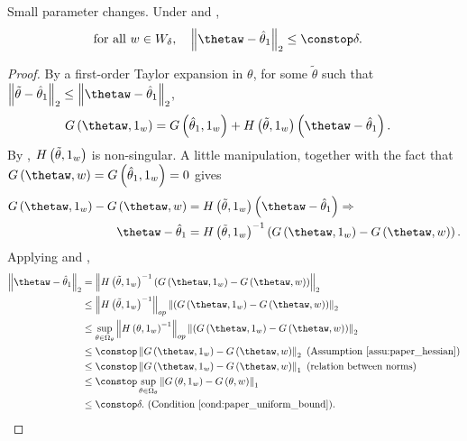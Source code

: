 \begin{lem}
\label{lem:theta_difference_bound}Small parameter changes. Under
\globalassum and ,
\begin{align*}
\textrm{for all }w\in W_{\delta},\quad\norm{{{\thetaw}}-\thetaone}_{2} & \le\constop\delta.
\end{align*}
\end{lem}
\begin{proof}
By a first-order Taylor expansion in $\theta$, for some $\tilde{\theta}$
such that $\norm{\tilde{\theta}-\thetaone}_{2}\le\norm{{{\thetaw}}-\thetaone}_{2}$,
\begin{align*}
G\left(\thetaw,\onevec\right) & =G\left(\thetaone,\onevec\right)+H\left(\tilde{\theta},\onevec\right)\left(\thetaw-\thetaone\right).
\end{align*}
By , $H\left(\tilde{\theta},1_{w}\right)$
is non-singular. A little manipulation, together with the fact that
$G\left(\thetaw,w\right)=G\left(\thetaone,\onevec\right)=0$ gives
\begin{align*}
G\left(\thetaw,\onevec\right)-G\left(\thetaw,w\right) & =H\left(\tilde{\theta},\onevec\right)\left(\thetaw-\thetaone\right)\Rightarrow\\
\thetaw-\thetaone & =H\left(\tilde{\theta},\onevec\right)^{-1}\left(G\left(\thetaw,\onevec\right)-G\left(\thetaw,w\right)\right).
\end{align*}
Applying  and ,
\begin{align*}
\norm{{{\thetaw}}-\thetaone}_{2} & =\norm{H\left(\tilde{\theta},\onevec\right)^{-1}\left(G\left({{\thetaw}},\onevec\right)-G\left({{\thetaw}},w\right)\right)}_{2}\\
 & \le\norm{H\left(\tilde{\theta},\onevec\right)^{-1}}_{op}\norm{\left(G\left({{\thetaw}},\onevec\right)-G\left({{\thetaw}},w\right)\right)}_{2}\\
 & \le\sup_{\theta\in\Omega_{\theta}}\norm{H\left(\theta,\onevec\right)^{-1}}_{op}\norm{\left(G\left({{\thetaw}},\onevec\right)-G\left({{\thetaw}},w\right)\right)}_{2}\\
 & \le\constop\norm{G\left({{\thetaw}},\onevec\right)-G\left({{\thetaw}},w\right)}_{2}\textrm{ (Assumption \ref{assu:paper_hessian})}\\
 & \le\constop\norm{G\left({{\thetaw}},\onevec\right)-G\left({{\thetaw}},w\right)}_{1}\textrm{ (relation between norms)}\\
 & \le\constop\sup_{\theta\in\Omega_{\theta}}\norm{G\left(\theta,\onevec\right)-G\left(\theta,w\right)}_{1}\\
 & \le\constop\delta.\textrm{ (Condition \ref{cond:paper_uniform_bound}).}
\end{align*}
\end{proof}
